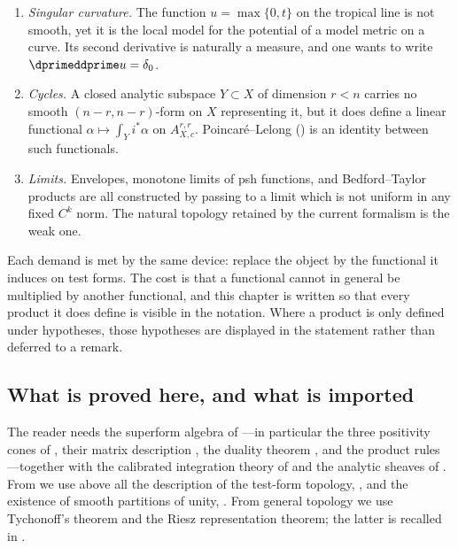 \begin{enumerate}
\item \emph{Singular curvature.}  The function $u=\max\{0,t\}$ on the
  tropical line is not smooth, yet it is the local model for the potential
  of a model metric on a curve. Its second derivative is naturally a
  measure, and one wants to write $\dprimeddprime u=\delta_0$.
\item \emph{Cycles.}  A closed analytic subspace $Y\subset X$ of dimension
  $r<n$ carries no smooth $(n-r,n-r)$-form on $X$ representing it, but
  it does define a linear functional
  $\alpha\mapsto\int_Yi^*\alpha$ on $A_{X,c}^{r,r}$.  Poincar\'e--Lelong
  () is an identity between such
  functionals.
\item \emph{Limits.}  Envelopes, monotone limits of psh functions, and
  Bedford--Taylor products are all constructed by passing to a limit which is
  not uniform in any fixed $C^k$ norm.  The natural topology retained by the
  current formalism is the weak one.
\end{enumerate}

Each demand is met by the same device: replace the object by the functional
it induces on test forms.  The cost is that a functional cannot in general be
multiplied by another functional, and this chapter is written so that every
product it does define is visible in the notation.  Where a product is only
defined under hypotheses, those hypotheses are displayed in the statement
rather than deferred to a remark.

\subsection{What is proved here, and what is imported}
\label{sec:ch14-prerequisites}

The reader needs the superform algebra of ---in
particular the three positivity cones of , their matrix
description , the duality theorem
, and the product rules
---together with the calibrated
integration theory of  and the analytic
sheaves of .  From  we use above
all the description of the test-form topology,
, and the existence of smooth
partitions of unity, .  From general topology
we use Tychonoff's theorem and the Riesz representation theorem; the latter
is recalled in .

